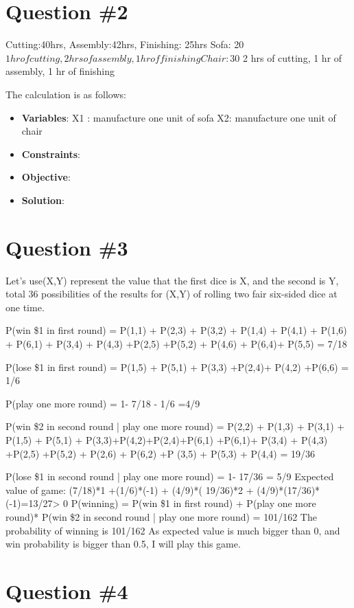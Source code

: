 \documentclass[conference]{styles/acmsiggraph}
\begin{document}
\section{Question \#2}

Cutting:40hrs, Assembly:42hrs, Finishing: 25hrs
Sofa: 20$ 1hr of cutting, 2hrs of assembly, 1 hr of finishing  
Chair: 30$ 2 hrs of cutting, 1 hr of assembly, 1 hr of finishing

The calculation is as follows:
\begin{itemize}
	\item \textbf{Variables}: X1 : manufacture one unit of sofa  X2: manufacture one unit of chair
	\item \textbf{Constraints}: 
	\item \textbf{Objective}:
	\item \textbf{Solution}:
\end{itemize}


\section{Question \#3}

Let's use(X,Y) represent the value that the first dice is X, and the second is Y, total 36 possibilities of the results for (X,Y) of rolling two fair six-sided dice at one time.

P(win \$1 in first round) = P(1,1) + P(2,3) + P(3,2) + P(1,4) + P(4,1) + P(1,6) + P(6,1) + P(3,4) + P(4,3) +P(2,5) +P(5,2) + P(4,6) + P(6,4)+ P(5,5) = 7/18

P(lose \$1 in first round) = P(1,5) + P(5,1) + P(3,3) +P(2,4)+ P(4,2) +P(6,6) = 1/6

P(play one more round) = 1- 7/18 - 1/6 =4/9

P(win \$2 in second round | play one more round) = P(2,2) + P(1,3) + P(3,1) + P(1,5) + P(5,1) + P(3,3)+P(4,2)+P(2,4)+P(6,1) +P(6,1)+ P(3,4) + P(4,3) +P(2,5) +P(5,2) + P(2,6) + P(6,2) +P (3,5) + P(5,3) + P(4,4) = 19/36

P(lose \$1 in second round | play one more round) = 1- 17/36 = 5/9 
Expected value of game: (7/18)*1 +(1/6)*(-1) + (4/9)*( 19/36)*2 + (4/9)*(17/36)*(-1)=13/27> 0
P(winning) = P(win \$1 in first round) + P(play one more round)* P(win \$2 in second round | play one more round) = 101/162
The probability of winning is 101/162
As expected value is much bigger than 0, and win probability is bigger than 0.5, I will play this game.



\section{Question \#4}
\end{document}

